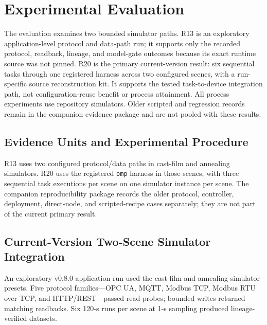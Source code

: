 \section{Experimental Evaluation}
\label{sec:eval}
The evaluation examines two bounded simulator paths. R13 is an exploratory
application-level protocol and data-path run; it supports only the recorded
protocol, readback, lineage, and model-gate outcomes because its exact runtime
source was not pinned. R20 is the primary current-version result: six
sequential tasks through one registered harness across two configured scenes,
with a run-specific source reconstruction kit. It supports the tested
task-to-device integration path, not configuration-reuse benefit or process
attainment. All process experiments use repository simulators. Older
scripted and regression records remain in the companion evidence package and
are not pooled with these results.

\subsection{Evidence Units and Experimental Procedure}
\label{sec:testbed}
\label{sec:procedure}
R13 uses two configured protocol/data paths in cast-film and annealing
simulators. R20 uses the registered \texttt{omp} harness in those scenes, with
three sequential task executions per scene on one simulator instance per
scene. The companion reproducibility package records the older protocol,
controller, deployment, direct-node, and scripted-recipe cases separately;
they are not part of the current primary result.

\subsection{Current-Version Two-Scene Simulator Integration}
\label{sec:crossscene}
An exploratory v0.8.0 application run used the cast-film and annealing
simulator presets. Five protocol families---OPC UA, MQTT, Modbus TCP, Modbus
RTU over TCP, and HTTP/REST---passed read probes; bounded writes returned
matching readbacks. Six 120-s runs per scene at 1-s sampling produced
lineage-verified datasets.

